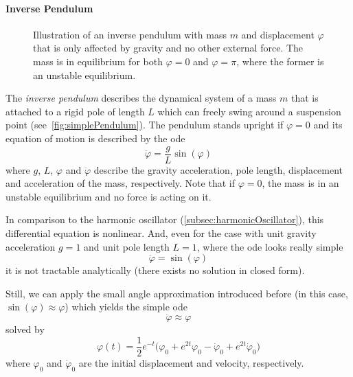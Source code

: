 	\paragraph{Inverse Pendulum}
		\label{subsec:simplePendulum}

		\begin{figure}
			\centering
			\tikzSimplePendulum
			\caption{Illustration of an inverse pendulum with mass \(m\) and displacement \(\varphi\) that is only affected by gravity and no other external force. The mass is in equilibrium for both \( \varphi = 0 \) and \( \varphi = \pi \), where the former is an unstable equilibrium.}
			\label{fig:simplePendulum}
		\end{figure}

		The \emph{inverse pendulum} describes the dynamical system of a mass \(m\) that is attached to a rigid pole of length \(L\) which can freely swing around a suspension point (see~\autoref{fig:simplePendulum}). The pendulum stands upright if \( \varphi = 0 \) and its equation of motion is described by the \ac{ode}
		\begin{equation*}
			\ddot{\varphi} = \frac{g}{L} \sin(\varphi)
		\end{equation*}
		where \(g\), \(L\), \(\varphi\) and \(\ddot{\varphi}\) describe the gravity acceleration, pole length, displacement and acceleration of the mass, respectively. Note that if \( \varphi = 0 \), the mass is in an unstable equilibrium and no force is acting on it.

		In comparison to the harmonic oscillator (\autoref{subsec:harmonicOscillator}), this differential equation is nonlinear. And, even for the case with unit gravity acceleration \( g = 1 \) and unit pole length \( L = 1\), where the \ac{ode} looks really simple
		\begin{equation}
			\ddot{\varphi} = \sin(\varphi)  \label{eq:inversePendulum}
		\end{equation}
		it is not tractable analytically (\ie there exists no solution in closed form).

		Still, we can apply the small angle approximation introduced before (in this case, \( \sin(\varphi) \approx \varphi \)) which yields the simple \ac{ode}
		\begin{equation}
			\ddot{\varphi} \approx \varphi  \label{eq:linearizedInversePendulum}
		\end{equation}
		solved by
		\begin{equation*}
			\varphi(t) = \frac{1}{2} e^{-t} \big(\varphi_0 + e^{2t} \varphi_0 - \dot{\varphi}_0 + e^{2t} \dot{\varphi}_0\big)
		\end{equation*}
		where \(\varphi_0\) and \(\dot{\varphi}_0\) are the initial displacement and velocity, respectively.

